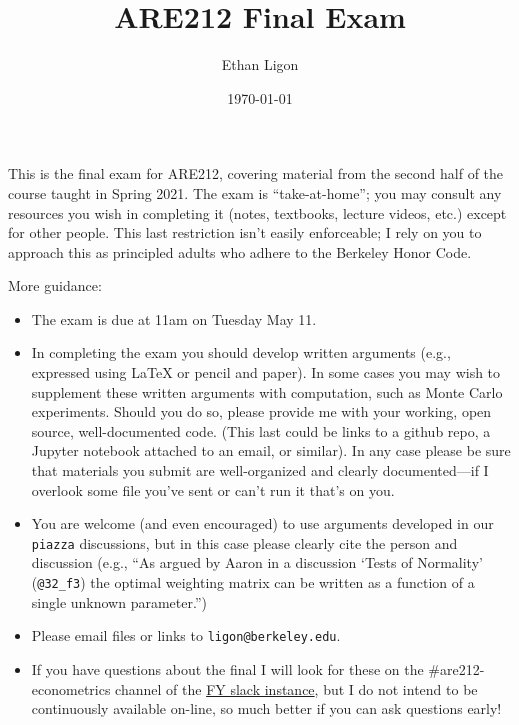 \documentclass[12pt]{amsart}
\author{Ethan Ligon}
\date{\today}
\title{ARE212 Final Exam}
\begin{document}
\maketitle

This is the final exam for ARE212, covering material from the second
half of the course taught in Spring 2021.   The exam is
``take-at-home''; you may consult any resources you wish in completing
it (notes, textbooks, lecture videos, etc.) except for other
people.  This last restriction isn't easily enforceable; I rely on
you to approach this as principled adults who adhere to the
Berkeley Honor Code.

More guidance:
\begin{itemize}
\item The exam is due at 11am  on Tuesday May 11.
\item In completing the exam you should develop written arguments
(e.g., expressed using \LaTeX{} or pencil and paper).  In some cases
you may wish to supplement these written arguments with
computation, such as Monte Carlo experiments.  Should you do so,
please provide me with your working, open source, well-documented code.  (This
last could be links to a github repo, a Jupyter notebook attached
to an email, or similar).  In any case please be sure that
materials you submit are well-organized and clearly
documented---if I overlook some file you've sent or can't run it
that's on you.
\item You are welcome (and even encouraged) to use arguments developed in our \texttt{piazza}
discussions, but in this case please clearly cite the person and
discussion (e.g., ``As argued by Aaron in a discussion `Tests of
Normality' (\texttt{@32\_f3})
the optimal weighting matrix can be written as a function of a
single unknown parameter.'')
\item Please email files or links to \texttt{ligon@berkeley.edu}.
\item If you have questions about the final I will look for these on the
\#are212-econometrics channel of the \href{https://app.slack.com/client/T01A34D5B6V/C01KC6ZBG4C}{FY slack instance}, but I do
not intend to be continuously available on-line, so much better if
you can ask questions early!
\end{itemize}
\end{document}
